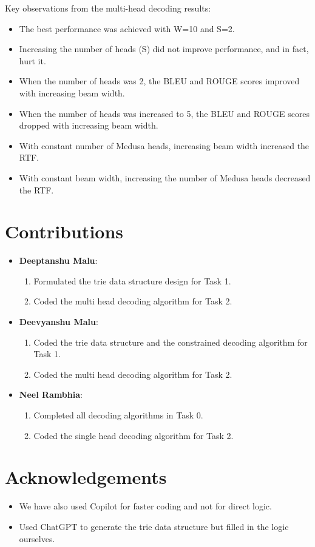 \documentclass[11pt]{article}
\begin{document}
Key observations from the multi-head decoding results:
\begin{itemize}
    \item The best performance was achieved with W=10 and S=2.
    \item Increasing the number of heads (S) did not improve performance, and in fact, hurt it.
    \item When the number of heads was 2, the BLEU and ROUGE scores improved with increasing beam width.
    \item When the number of heads was increased to 5, the BLEU and ROUGE scores dropped with increasing beam width.
    \item With constant number of Medusa heads, increasing beam width increased the RTF.
    \item With constant beam width, increasing the number of Medusa heads decreased the RTF.
\end{itemize}

\section*{Contributions}

\begin{itemize}
    \item \textbf{Deeptanshu Malu}:
    \begin{enumerate}
        \item Formulated the trie data structure design for Task 1.
        \item Coded the multi head decoding algorithm for Task 2.
    \end{enumerate}

    \item \textbf{Deevyanshu Malu}:
    \begin{enumerate}
        \item Coded the trie data structure and the constrained decoding algorithm for Task 1.
        \item Coded the multi head decoding algorithm for Task 2.
    \end{enumerate}

    \item \textbf{Neel Rambhia}:
    \begin{enumerate}
        \item Completed all decoding algorithms in Task 0.
        \item Coded the single head decoding algorithm for Task 2.
    \end{enumerate}
\end{itemize}

\section*{Acknowledgements}

\begin{itemize}
    \item We have also used Copilot for faster coding and not for direct logic.
    \item Used ChatGPT to generate the trie data structure but filled in the logic ourselves.
\end{itemize}
\end{document}
